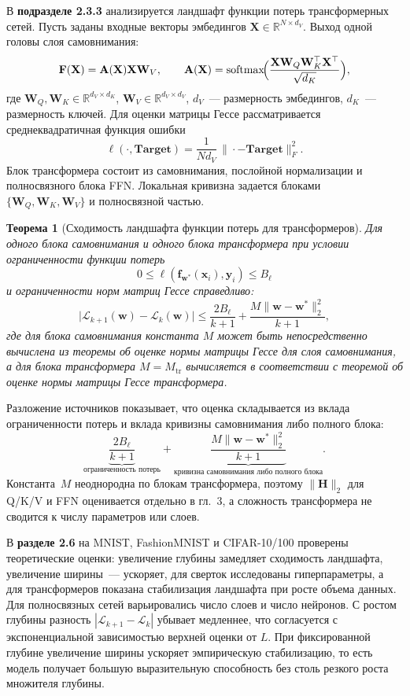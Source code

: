 \documentclass{dissert}
\newtheorem{theorem}{Теорема}
\begin{document}
В \textbf{подразделе 2.3.3} анализируется ландшафт функции потерь трансформерных сетей.
Пусть заданы входные векторы эмбедингов $\mathbf{X} \in \mathbb{R}^{N \times d_V}$. Выход одной головы слоя самовнимания:
\[
    \mathbf{F}(\mathbf{X})
    =
    \mathbf{A}(\mathbf{X})\mathbf{X}\mathbf{W}_V,
    \qquad
    \mathbf{A}(\mathbf{X})
    =
    \mathrm{softmax}\!\Bigl(\frac{\mathbf{X}\mathbf{W}_Q\mathbf{W}_K^\top\mathbf{X}^\top}{\sqrt{d_K}}\Bigr),
\]
где $\mathbf{W}_Q,\mathbf{W}_K\in\mathbb{R}^{d_V\times d_K}$, $\mathbf{W}_V\in\mathbb{R}^{d_V\times d_V}$, $d_V$~--- размерность эмбедингов, $d_K$~--- размерность ключей. Для оценки матрицы Гессе рассматривается среднеквадратичная функция ошибки
\[
    \ell(\cdot,\mathbf{Target}) = \frac{1}{N d_V}\,\|\cdot-\mathbf{Target}\|_F^2.
\]
Блок трансформера состоит из самовнимания, послойной нормализации и полносвязного блока FFN. Локальная кривизна задается блоками~$\{\mathbf{W}_Q,\mathbf{W}_K,\mathbf{W}_V\}$ и полносвязной частью.

\begin{theorem}[Сходимость ландшафта функции потерь для трансформеров]
Для одного блока самовнимания и одного блока трансформера при условии ограниченности функции потерь
\[
    0 \le \ell(\mathbf{f}_{\mathbf{w}^*}(\mathbf{x}_i),\mathbf{y}_i) \le B_{\ell}
\]
и ограниченности норм матриц Гессе справедливо:
\[
    \bigl|\mathcal{L}_{k+1}(\mathbf{w})-\mathcal{L}_k(\mathbf{w})\bigr|
    \le
    \frac{2B_{\ell}}{k+1}
    +
    \frac{M\|\mathbf{w}-\mathbf{w}^*\|_2^2}{k+1},
\]
где для блока самовнимания константа $M$ может быть непосредственно вычислена из теоремы об оценке нормы матрицы Гессе для слоя самовнимания, а для блока трансформера $M=M_{\mathrm{tr}}$ вычисляется в соответствии с теоремой об оценке нормы матрицы Гессе трансформера.
\end{theorem}
Разложение источников показывает, что оценка складывается из вклада ограниченности потерь и вклада кривизны самовнимания либо полного блока:
\[
    \underbrace{\frac{2B_{\ell}}{k+1}}_{\text{ограниченность потерь}}
    +
    \underbrace{\frac{M\|\mathbf{w}-\mathbf{w}^*\|_2^2}{k+1}}_{\text{кривизна самовнимания либо полного блока}}.
\]
Константа~$M$ неоднородна по блокам трансформера, поэтому $\|\mathbf{H}\|_2$ для Q/K/V и FFN оценивается отдельно в гл.~3, а сложность трансформера не сводится к числу параметров или слоев.

В \textbf{разделе 2.6} на MNIST, FashionMNIST и CIFAR-10/100 проверены теоретические оценки: увеличение глубины замедляет сходимость ландшафта, увеличение ширины~--- ускоряет, для сверток исследованы гиперпараметры, а для трансформеров показана стабилизация ландшафта при росте объема данных.
Для полносвязных сетей варьировались число слоев и число нейронов.
С ростом глубины разность $\left|\mathcal{L}_{k+1}-\mathcal{L}_k\right|$ убывает медленнее, что согласуется с экспоненциальной зависимостью верхней оценки от $L$.
При фиксированной глубине увеличение ширины ускоряет эмпирическую стабилизацию, то есть модель получает большую выразительную способность без столь резкого роста множителя глубины.
\end{document}
